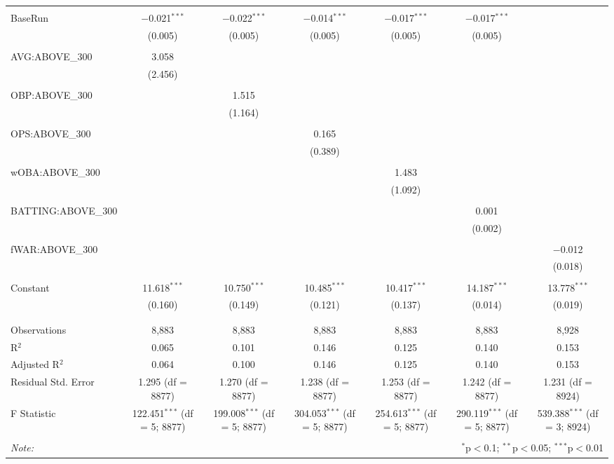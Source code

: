 \begin{table}[!htbp]
\begin{tabular}{@{\extracolsep{5pt}}lcccccc}
  & & & & & & \\
 BaseRun & $-$0.021$^{***}$ & $-$0.022$^{***}$ & $-$0.014$^{***}$ & $-$0.017$^{***}$ & $-$0.017$^{***}$ &  \\
  & (0.005) & (0.005) & (0.005) & (0.005) & (0.005) &  \\
  & & & & & & \\
 AVG:ABOVE\_300 & 3.058 &  &  &  &  &  \\
  & (2.456) &  &  &  &  &  \\
  & & & & & & \\
 OBP:ABOVE\_300 &  & 1.515 &  &  &  &  \\
  &  & (1.164) &  &  &  &  \\
  & & & & & & \\
 OPS:ABOVE\_300 &  &  & 0.165 &  &  &  \\
  &  &  & (0.389) &  &  &  \\
  & & & & & & \\
 wOBA:ABOVE\_300 &  &  &  & 1.483 &  &  \\
  &  &  &  & (1.092) &  &  \\
  & & & & & & \\
 BATTING:ABOVE\_300 &  &  &  &  & 0.001 &  \\
  &  &  &  &  & (0.002) &  \\
  & & & & & & \\
 fWAR:ABOVE\_300 &  &  &  &  &  & $-$0.012 \\
  &  &  &  &  &  & (0.018) \\
  & & & & & & \\
 Constant & 11.618$^{***}$ & 10.750$^{***}$ & 10.485$^{***}$ & 10.417$^{***}$ & 14.187$^{***}$ & 13.778$^{***}$ \\
  & (0.160) & (0.149) & (0.121) & (0.137) & (0.014) & (0.019) \\
  & & & & & & \\
\hline \\[-1.8ex]
Observations & 8,883 & 8,883 & 8,883 & 8,883 & 8,883 & 8,928 \\
R$^{2}$ & 0.065 & 0.101 & 0.146 & 0.125 & 0.140 & 0.153 \\
Adjusted R$^{2}$ & 0.064 & 0.100 & 0.146 & 0.125 & 0.140 & 0.153 \\
Residual Std. Error & 1.295 (df = 8877) & 1.270 (df = 8877) & 1.238 (df = 8877) & 1.253 (df = 8877) & 1.242 (df = 8877) & 1.231 (df = 8924) \\
F Statistic & 122.451$^{***}$ (df = 5; 8877) & 199.008$^{***}$ (df = 5; 8877) & 304.053$^{***}$ (df = 5; 8877) & 254.613$^{***}$ (df = 5; 8877) & 290.119$^{***}$ (df = 5; 8877) & 539.388$^{***}$ (df = 3; 8924) \\
\hline
\hline \\[-1.8ex]
\textit{Note:}  & \multicolumn{6}{r}{$^{*}$p$<$0.1; $^{**}$p$<$0.05; $^{***}$p$<$0.01} \\
\end{tabular}
\end{table}
